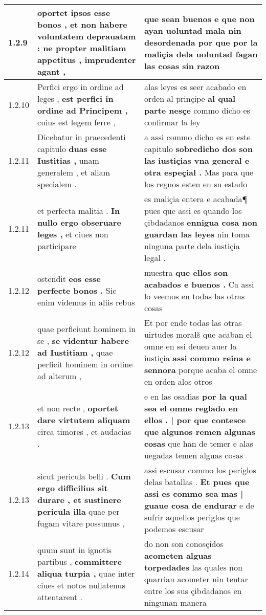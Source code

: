 \begin{tabular}{|p{1cm}|p{6.5cm}|p{6.5cm}|}
1.2.9 & oportet ipsos esse bonos , \textbf{ et non habere voluntatem deprauatam : } ne propter malitiam appetitus , imprudenter agant , & que sean buenos \textbf{ e que non ayan uoluntad mala nin desordenada } por que por la maliçia dela uoluntad fagan las cosas sin razon \\\hline
1.2.10 & Perfici ergo in ordine ad leges , \textbf{ est perfici in ordine ad Principem , } cuius est legem ferre , & alas leyes es seer acabado en orden al prinçipe \textbf{ al qual parte nesçe } commo dicho es confirmar la ley \\\hline
1.2.11 & Dicebatur in praecedenti capitulo \textbf{ duas esse Iustitias , } unam generalem , et aliam specialem . & a assi commo dicho es en este capitulo \textbf{ sobredicho dos son las iustiçias vna general e otra espeçial . } Mas para que los regnos esten en su estado \\\hline
1.2.11 & et perfecta malitia . \textbf{ In nullo ergo obseruare leges , } et ciues non participare & es maliçia entera e acabada¶ pues que assi es quando los çibdadanos \textbf{ ennigua cosa non guardan las leyes } nin toma ninguna parte dela iustiçia legal . \\\hline
1.2.12 & ostendit \textbf{ eos esse perfecte bonos . } Sic enim videmus in aliis rebus & muestra \textbf{ que ellos son acabados e buenos . } Ca assi lo veemos en todas las otras cosas \\\hline
1.2.12 & quae perficiunt hominem in se , \textbf{ se videntur habere ad Iustitiam , } quae perficit hominem in ordine ad alterum , & Et por ende todas las otras uirtudes morałs̃ que acaban el omne en ssi deuen auer la iustiçia \textbf{ assi commo reina e sennora } porque acaba el omne en orden alos otros \\\hline
1.2.13 & et non recte , \textbf{ oportet dare virtutem aliquam } circa timores , et audacias . & e en las osadias \textbf{ por la qual sea el omne reglado en ellos . | por que contesce que algunos remen algunas cosas } que han de temer e alas uegadas temen alguas cosas \\\hline
1.2.13 & sicut pericula belli . \textbf{ Cum ergo difficilius sit durare , et sustinere pericula illa } quae per fugam vitare possumus , & assi escusar commo los periglos delas batallas . \textbf{ Et pues que assi es commo sea mas | guaue cosa de endurar } e de sufrir aquellos periglos que podemos escusar \\\hline
1.2.14 & quum sunt in ignotis partibus , \textbf{ committere aliqua turpia , } quae inter ciues et notos nullatenus attentarent . & do non son conosçidos \textbf{ acometen alguas torpedades } las quales non quarrian acometer nin tentar entre los sus çibdadanos en ningunan manera \\\hline

\end{tabular}
